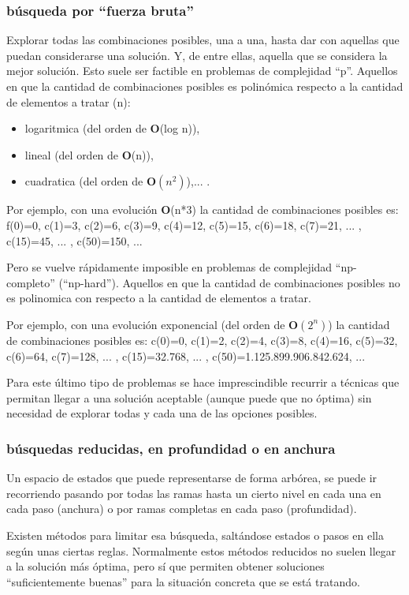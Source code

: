 \documentclass[spanish,12pt,a4paper,final,oneside]{book}
\begin{document}
\subsubsection{búsqueda por ``fuerza bruta''}
Explorar todas las combinaciones posibles, una a una, hasta dar con aquellas que puedan considerarse una solución. Y, de entre ellas, aquella que se considera la mejor solución.
Esto suele ser factible en problemas de complejidad ``p''. Aquellos en que la cantidad de combinaciones posibles es polinómica respecto a la cantidad de elementos a tratar (n):
\begin{itemize}
\item logaritmica (del orden de \textbf{O}(log n)), 
\item lineal (del orden de \textbf{O}(n)), 
\item cuadratica (del orden de $\textbf{O}(n^2)$),... . 
\end{itemize}

Por ejemplo, con una evolución \textbf{O}(n*3) la cantidad de combinaciones posibles es: f(0)=0, c(1)=3, c(2)=6, c(3)=9, c(4)=12, c(5)=15, c(6)=18, c(7)=21, ... , c(15)=45, ... , c(50)=150, ...

Pero se vuelve rápidamente imposible en problemas de complejidad ``np-completo'' (``np-hard''). Aquellos en que la cantidad de combinaciones posibles no es polinomica con respecto a la cantidad de elementos a tratar. 

Por ejemplo, con una evolución exponencial (del orden de $\textbf{O}(2^n)$) la cantidad de combinaciones posibles es: c(0)=0, c(1)=2, c(2)=4, c(3)=8, c(4)=16, c(5)=32, c(6)=64, c(7)=128, ... , c(15)=32.768, ... , c(50)=1.125.899.906.842.624, ...

Para este último tipo de problemas se hace imprescindible recurrir a técnicas que permitan llegar a una solución aceptable (aunque puede que no óptima) sin necesidad de explorar todas y cada una de las opciones posibles.

\subsubsection{búsquedas reducidas, en profundidad o en anchura}
Un espacio de estados que puede representarse de forma arbórea, se puede ir recorriendo pasando por todas las ramas hasta un cierto nivel en cada una en cada paso (anchura) o por ramas completas en cada paso (profundidad).

Existen métodos para limitar esa búsqueda, saltándose estados o pasos en ella según unas ciertas reglas. Normalmente estos métodos reducidos no suelen llegar a la solución más óptima, pero sí que permiten obtener soluciones ``suficientemente buenas'' para la situación concreta que se está tratando.
\end{document}
